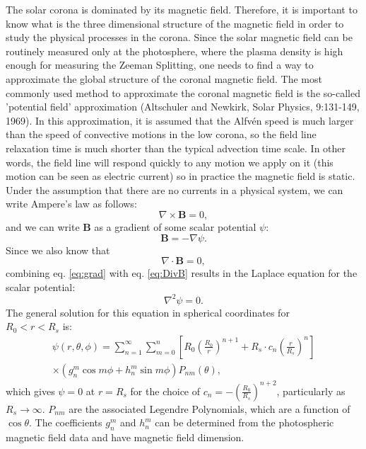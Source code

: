 The solar corona is dominated by its magnetic field. Therefore, it is 
important to know what is the three dimensional structure of the magnetic 
field in order to study the physical processes in the corona. Since the solar 
magnetic field can be routinely measured only at the photosphere, where the 
plasma density is high enough for measuring the Zeeman Splitting, one needs 
to find a way to approximate the global structure of the coronal magnetic 
field. The most commonly used method to approximate the coronal magnetic 
field is the so-called 'potential field' approximation (Altschuler and 
Newkirk, Solar Physics, 9:131-149, 1969). In this approximation, it is 
assumed that the Alfv\'en speed is much larger than the speed of convective 
motions in the low corona, so the field line relaxation time is much shorter 
than the typical advection time scale. In other words, the field line will 
respond quickly to any motion we apply on it (this motion can be seen as 
electric current) so in practice the magnetic field is static. Under the 
assumption that there are no currents in a physical system, we can write 
Ampere's law as follows:
\begin{equation}
\label{eq:Amper1}
\nabla \times \mathbf{B}=0,
\end{equation}
and we can write $\mathbf{B}$ as a gradient of some scalar potential $\psi$:
\begin{equation}
\label{eq:grad}
\mathbf{B}=-\nabla \psi.
\end{equation}
Since we also know that 
\begin{equation}
\label{eq:DivB}
\nabla \cdot \mathbf{B}=0,
\end{equation}
combining eq. \ref{eq:grad} with eq. \ref{eq:DivB} results in the Laplace equation 
for the scalar potential:
\begin{equation}
\label{eq:Laplace}
\nabla^2\psi=0.
\end{equation}
The general solution for this equation in spherical coordinates for \\
$R_0 < r < R_s$ is:
\begin{eqnarray}
\label{eq:GaneralSol}
\psi(r,\theta,\phi)=\mathop{\sum}_{n=1}^{\infty}\mathop{\sum}_{m=0}^{n}
\left[ R_0\left( \frac{R_0}{r}\right)^{n+1}+R_s \cdot c_n \left( \frac{r}{R_s}
\right)^{n} 
\right] \nonumber \\
\times \left(g_n^m \cos{m\phi} + h_n^m \sin{m\phi} \right)P_{nm}(\theta),
\end{eqnarray}
which gives $\psi=0$ at $r=R_s$ for the choice of $c_n=-\left( \frac{R_0}{R_s} 
\right)^{n+2}$, 
particularly as 
$R_s \rightarrow \infty$. 
$P_{nm}$ are the associated Legendre Polynomials, which are a function of 
$\cos{\theta}$. 
The coefficients 
$g_n^m$ and $h_n^m$ can be determined from the photospheric magnetic field 
data and have magnetic field dimension.

